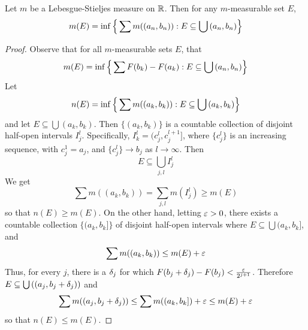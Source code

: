 \begin{lemma}\label{lemma_1.4.4}
    Let $m$ be a Lebesgue-Stieljes measure on $\mathbb{R}$. Then for any $m$-measurable
    set $E$,
    \begin{equation}\label{equation_1.10}
        m(E)=\inf{\Big{\{} \sum{m((a_n,b_n))} : E \subseteq \bigcup{(a_n,b_n)} \Big{\}}}
    \end{equation}
\end{lemma}
\begin{proof}
    Observe that for all $m$-measurable sets  $E$, that
    \begin{equation*}
        m(E)=\inf{\Big{\{} \sum{F(b_k)-F(a_k)} : E \subseteq \bigcup{(a_n,b_n)} \Big{\}}}
    \end{equation*}
    Let
    \begin{equation*}
        n(E)=\inf{\Big{\{} \sum{m((a_k,b_k))} : E \subseteq \bigcup{(a_k,b_k)} \Big{\}}}
    \end{equation*}
    and let $E \subseteq \bigcup{(a_k,b_k)}$. Then $\{(a_k,b_k)\}$ is a
    countable collection of disjoint half-open intervals $I_j^l$. Specifically,
    $I_k^l=(c_j^l,c_j^{l+1}]$, where $\{c_j^l\}$ is an increasing sequence, with
    $c_j^1=a_j$, and $\{c_j^l\} \xrightarrow{} b_j$ as $l \xrightarrow{}
    \infty$. Then
    \begin{equation*}
        E \subseteq \bigcup_{j,l}{I_j^l}
    \end{equation*}
    We get
    \begin{equation*}
        \sum{m((a_k,b_k))}=\sum_{j,l}{m(I_j^l)} \geq m(E)
    \end{equation*}
    so that $n(E) \geq m(E)$. On the other hand, letting $\varepsilon>0$, there exists a
    countable collection $\{(a_k,b_k]\}$ of disjoint half-open intervals where
    $E \subseteq \bigcup{(a_k,b_k]}$, and
    \begin{equation*}
        \sum{m((a_k,b_k))} \leq m(E)+\varepsilon
    \end{equation*}
    Thus, for every $j$, there is a  $\delta_j$ for which
    $F(b_j+\delta_j)-F(b_j)<\frac{\varepsilon}{2^{j+1}}$. Therefore $E \subseteq
    \bigcup{((a_j,b_j+\delta_j))}$ and
    \begin{equation*}
        \sum{m((a_j,b_j+\delta_j))} \leq \sum{m((a_k,b_k])}+\varepsilon \leq m(E)+\varepsilon
    \end{equation*}
    so that $n(E) \leq m(E)$.
\end{proof}

